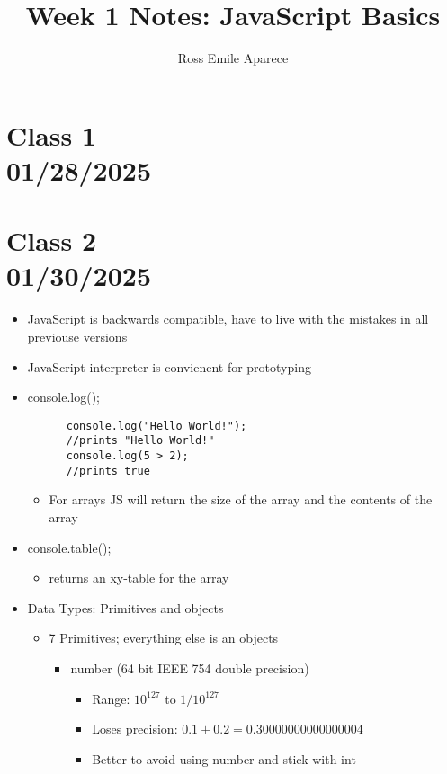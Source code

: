 \documentclass{article}
\title{Week 1 Notes: JavaScript Basics}
\date{}
\author{Ross Emile Aparece}
\begin{document}
\maketitle

\section*{Class 1 \\ 01/28/2025}\label{sec:Class 1}

\pagebreak
\section*{Class 2 \\ 01/30/2025}\label{sec:Class 2}
\begin{itemize}
  \item JavaScript is backwards compatible, have to live with the mistakes in all previouse versions
  \item JavaScript interpreter is convienent for prototyping
  \item console.log();
    \begin{lstlisting}
      console.log("Hello World!");
      //prints "Hello World!"
      console.log(5 > 2);
      //prints true
    \end{lstlisting}
    \begin{itemize}
      \item For arrays JS will return the size of the array and the contents of the array
    \end{itemize}
  \item console.table();
    \begin{itemize}
      \item returns an xy-table for the array
    \end{itemize}
  \item Data Types: Primitives and objects
    \begin{itemize}
      \item 7 Primitives; everything else is an objects
      \begin{itemize}
        \item number (64 bit IEEE 754 double precision)
        \begin{itemize}
          \item Range: \(10^{127}\) to \(1/10^{127}\)
          \item Loses precision: \(0.1 + 0.2 = 0.30000000000000004\)
          \item Better to avoid using number and stick with int

\end{itemize}
\end{itemize}
\end{itemize}
\end{itemize}
\end{document}
